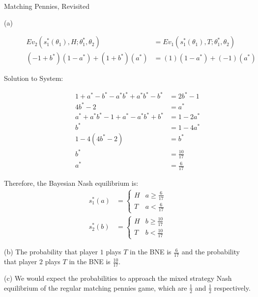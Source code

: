 \documentclass[8pt]{extarticle}
\begin{document}
\begin{problem}{Matching Pennies, Revisited}
\begin{problem}{(a)}
\begin{description}
          \begin{align*}
            Ev_{2}(s_1^{\ast}(\theta_1),H;\theta_1^{\ast},\theta_2) &= Ev_{1}(s_1^{\ast}(\theta_1),T;\theta_1^{\ast},\theta_2)\\
            (-1+b^{\ast})(1-a^{\ast}) + (1+b^{\ast})(a^{\ast}) &= (1)(1-a^{\ast}) + (-1)(a^{\ast})
          \end{align*}
        \item[Solution to System:]
          \begin{align*}
            1 + a^{\ast} - b^{\ast} - a^{\ast}b^{\ast} + a^{\ast}b^{\ast} - b^{\ast} &= 2b^{\ast} - 1\tag*{Player 1 Indifference Condition}\\
            4b^{\ast} - 2 &= a^{\ast}\\
            a^{\ast} + a^{\ast}b^{\ast} - 1 + a^{\ast} - a^{\ast}b^{\ast} + b^{\ast} &= 1-2a^{\ast}\tag*{Player 2 Indifference Condition}\\
            b^{\ast} &= 1-4a^{\ast}\\
            1-4(4b^{\ast} - 2) &= b^{\ast}\\
            b^{\ast} &= \frac{10}{17}\\
            a^{\ast} &= \frac{6}{17}
          \end{align*}
      \end{description}
      Therefore, the Bayesian Nash equilibrium is:
      \begin{align*}
        s_1^{\ast}(a) &= \begin{cases}
          H & a\geq \frac{6}{17}\\
          T & a < \frac{6}{17}
        \end{cases}\\
          s_2^{\ast}(b) &= \begin{cases}
            H & b\geq \frac{10}{17}\\
            T & b < \frac{10}{17}
          \end{cases}
      \end{align*}
    \end{problem}
    \begin{problem}{(b)}
      The probability that player $1$ plays $T$ in the BNE is $\frac{6}{17}$ and the probability that player $2$ plays $T$ in the BNE is $\frac{10}{17}$.
    \end{problem}
    \begin{problem}{(c)}
      We would expect the probabilities to approach the mixed strategy Nash equilibrium of the regular matching pennies game, which are $\frac{1}{2}$ and $\frac{1}{2}$ respectively.
    \end{problem}
  \end{problem}
\end{document}
